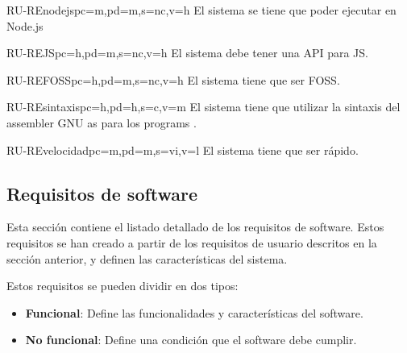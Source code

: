 \begin{userReq}{RU-RE}{nodejs}{pc=m,pd=m,s=nc,v=h}
    El sistema se tiene que poder ejecutar en Node.js
\end{userReq}

\begin{userReq}{RU-RE}{JS}{pc=h,pd=m,s=nc,v=h}
    El sistema debe tener una \gls{API} para \gls{JS}.
\end{userReq}

\begin{userReq}{RU-RE}{FOSS}{pc=h,pd=m,s=nc,v=h}
    El sistema tiene que ser \gls{FOSS}.
\end{userReq}

\begin{userReq}{RU-RE}{sintaxis}{pc=h,pd=h,s=c,v=m}
    El sistema tiene que utilizar la sintaxis del \gls{assembler} GNU as para
    los \glspl{program} .
\end{userReq}

\begin{userReq}{RU-RE}{velocidad}{pc=m,pd=m,s=vi,v=l}
    El sistema tiene que ser rápido. %
\end{userReq}

\FloatBarrier


\subsection{Requisitos de software}\label{subsec:software-requirements}

Esta sección contiene el listado detallado de los requisitos de software. Estos
requisitos se han creado a partir de los requisitos de usuario descritos en la
sección anterior, y definen las características del sistema.

\noindent
Estos requisitos se pueden dividir en dos tipos:

\begin{itemize}
    \item \textbf{Funcional}: Define las funcionalidades y características del
    software.
    \item \textbf{No funcional}: Define una condición que el software debe cumplir.
\end{itemize}

